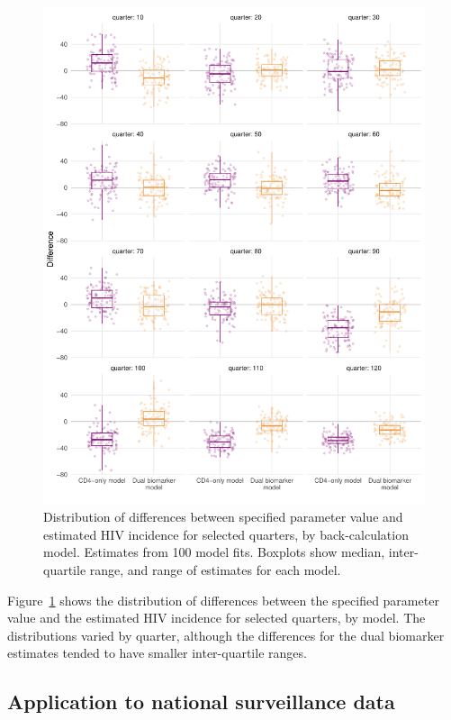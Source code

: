 \begin{figure}[htbp!]
  \centering
  \includegraphics[width=\textwidth]{incidence_boxplot_sim_year.pdf}
  \caption[Distribution of differences between specified parameter value and estimated HIV incidence for selected quarters, by back-calculation model]{Distribution of differences between specified parameter value and estimated HIV incidence for selected quarters, by back-calculation model. Estimates from 100 model fits. Boxplots show median, inter-quartile range, and range of estimates for each model.}\label{fig:boxplot_sim_year}
\end{figure}

Figure~\ref{fig:boxplot_sim_year} shows the distribution of differences between the specified parameter value and the estimated HIV incidence for selected quarters, by model. The distributions varied by quarter, although the differences for the dual biomarker estimates tended to have smaller inter-quartile ranges.

\subsection{Application to national surveillance data}

